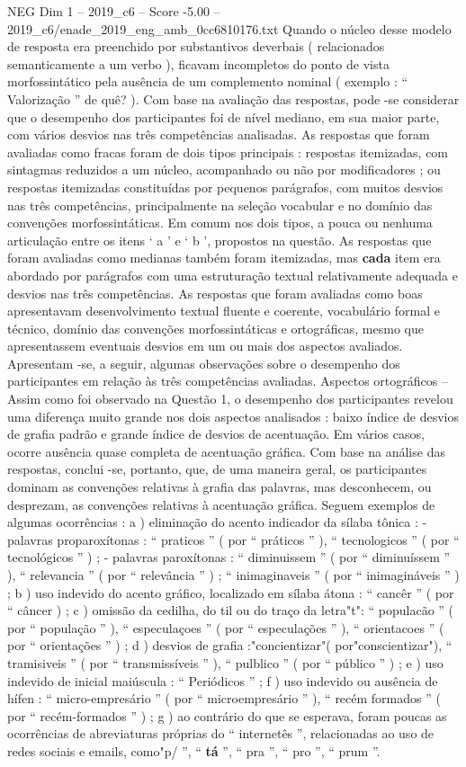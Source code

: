 \begin{textsample}{NEG Dim 1 – 2019\_c6 – Score -5.00 – 2019\_c6/enade\_2019\_eng\_amb\_0cc6810176.txt}
Quando o núcleo desse modelo de resposta era preenchido por substantivos deverbais ( relacionados semanticamente a um verbo ), ficavam incompletos do ponto de vista morfossintático pela ausência de um complemento nominal ( exemplo : “ Valorização ” de quê? ).
Com base na avaliação das respostas, pode -se considerar que o desempenho dos participantes foi de nível mediano, em sua maior parte, com vários desvios nas três competências analisadas.
As respostas que foram avaliadas como fracas foram de dois tipos principais : respostas itemizadas, com sintagmas reduzidos a um núcleo, acompanhado ou não por modificadores ; ou respostas itemizadas constituídas por pequenos parágrafos, com muitos desvios nas três competências, principalmente na seleção vocabular e no domínio das convenções morfossintáticas.
Em comum nos dois tipos, a pouca ou nenhuma articulação entre os itens ‘ a ’ e ‘ b ’, propostos na questão.
As respostas que foram avaliadas como medianas também foram itemizadas, mas \textbf{cada} item era abordado por parágrafos com uma estruturação textual relativamente adequada e desvios nas três competências.
As respostas que foram avaliadas como boas apresentavam desenvolvimento textual fluente e coerente, vocabulário formal e técnico, domínio das convenções morfossintáticas e ortográficas, mesmo que apresentassem eventuais desvios em um ou mais dos aspectos avaliados.
Apresentam -se, a seguir, algumas observações sobre o desempenho dos participantes em relação às três competências avaliadas.
Aspectos ortográficos – Assim como foi observado na Questão 1, o desempenho dos participantes revelou uma diferença muito grande nos dois aspectos analisados : baixo índice de desvios de grafia padrão e grande índice de desvios de acentuação.
Em vários casos, ocorre ausência quase completa de acentuação gráfica.
Com base na análise das respostas, conclui -se, portanto, que, de uma maneira geral, os participantes dominam as convenções relativas à grafia das palavras, mas desconhecem, ou desprezam, as convenções relativas à acentuação gráfica.
Seguem exemplos de algumas ocorrências : a ) eliminação do acento indicador da sílaba tônica : - palavras proparoxítonas : “ praticos ” ( por “ práticos ” ), “ tecnologicos ” ( por “ tecnológicos ” ) ; - palavras paroxítonas : “ diminuissem ” ( por “ diminuíssem ” ), “ relevancia ” ( por “ relevância ” ) ; “ inimaginaveis ” ( por “ inimagináveis ” ) ; b ) uso indevido do acento gráfico, localizado em sílaba átona : “ cancêr ” ( por “ câncer ) ; c ) omissão da cedilha, do til ou do traço da letra"t": “ populacão ” ( por “ população ” ), “ especulaçoes ” ( por “ especulações ” ), “ orientacoes ” ( por “ orientações ” ) ; d ) desvios de grafia :"concientizar"( por"conscientizar"), “ tramisiveis ” ( por “ transmissíveis ” ), “ pulblico ” ( por “ público ” ) ; e ) uso indevido de inicial maiúscula : “ Periódicos ” ; f ) uso indevido ou ausência de hífen : “ micro-empresário ” ( por “ microempresário ” ), “ recém formados ” ( por “ recém-formados ” ) ; g ) ao contrário do que se esperava, foram poucas as ocorrências de abreviaturas próprias do “ internetês ”, relacionadas ao uso de redes sociais e emails, como"p/ ”, “ \textbf{tá} ”, “ pra ”, “ pro ”, “ prum ”.

\end{textsample}
